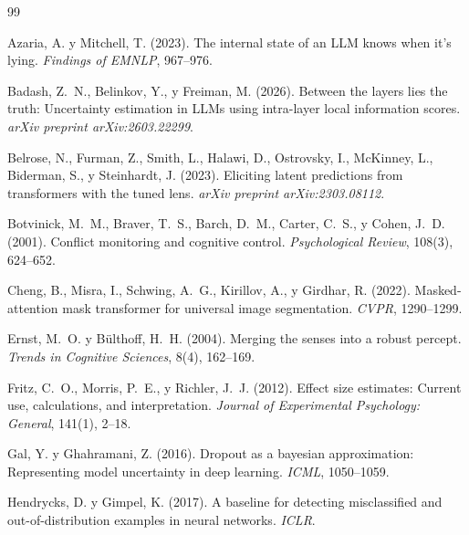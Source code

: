 \documentclass[12pt,a4paper]{article}
\begin{document}
\newpage

\begin{thebibliography}{99}

Azaria, A. y Mitchell, T. (2023).
The internal state of an LLM knows when it's lying.
\emph{Findings of EMNLP}, 967--976.

Badash, Z.~N., Belinkov, Y., y Freiman, M. (2026).
Between the layers lies the truth: Uncertainty estimation in LLMs using intra-layer local information scores.
\emph{arXiv preprint arXiv:2603.22299}.

Belrose, N., Furman, Z., Smith, L., Halawi, D., Ostrovsky, I., McKinney, L., Biderman, S., y Steinhardt, J. (2023).
Eliciting latent predictions from transformers with the tuned lens.
\emph{arXiv preprint arXiv:2303.08112}.

Botvinick, M.~M., Braver, T.~S., Barch, D.~M., Carter, C.~S., y Cohen, J.~D. (2001).
Conflict monitoring and cognitive control.
\emph{Psychological Review}, 108(3), 624--652.

Cheng, B., Misra, I., Schwing, A.~G., Kirillov, A., y Girdhar, R. (2022).
Masked-attention mask transformer for universal image segmentation.
\emph{CVPR}, 1290--1299.

Ernst, M.~O. y B\"ulthoff, H.~H. (2004).
Merging the senses into a robust percept.
\emph{Trends in Cognitive Sciences}, 8(4), 162--169.

Fritz, C.~O., Morris, P.~E., y Richler, J.~J. (2012).
Effect size estimates: Current use, calculations, and interpretation.
\emph{Journal of Experimental Psychology: General}, 141(1), 2--18.

Gal, Y. y Ghahramani, Z. (2016).
Dropout as a bayesian approximation: Representing model uncertainty in deep learning.
\emph{ICML}, 1050--1059.

Hendrycks, D. y Gimpel, K. (2017).
A baseline for detecting misclassified and out-of-distribution examples in neural networks.
\emph{ICLR}.


\end{thebibliography}
\end{document}
